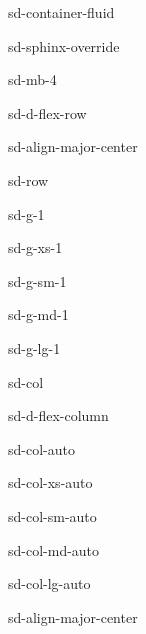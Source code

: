 \documentclass[letterpaper,10pt,english]{jupyterBook}
\begin{document}
\begin{sphinxuseclass}{sd-container-fluid}
\begin{sphinxuseclass}{sd-sphinx-override}
\begin{sphinxuseclass}{sd-mb-4}
\begin{sphinxuseclass}{sd-d-flex-row}
\begin{sphinxuseclass}{sd-align-major-center}
\begin{sphinxuseclass}{sd-row}
\begin{sphinxuseclass}{sd-g-1}
\begin{sphinxuseclass}{sd-g-xs-1}
\begin{sphinxuseclass}{sd-g-sm-1}
\begin{sphinxuseclass}{sd-g-md-1}
\begin{sphinxuseclass}{sd-g-lg-1}
\begin{sphinxuseclass}{sd-col}
\begin{sphinxuseclass}{sd-d-flex-column}
\begin{sphinxuseclass}{sd-col-auto}
\begin{sphinxuseclass}{sd-col-xs-auto}
\begin{sphinxuseclass}{sd-col-sm-auto}
\begin{sphinxuseclass}{sd-col-md-auto}
\begin{sphinxuseclass}{sd-col-lg-auto}
\begin{sphinxuseclass}{sd-align-major-center}\begin{center}\end{center}
\end{sphinxuseclass}
\end{sphinxuseclass}
\end{sphinxuseclass}
\end{sphinxuseclass}
\end{sphinxuseclass}
\end{sphinxuseclass}
\end{sphinxuseclass}

\end{sphinxuseclass}
\end{sphinxuseclass}
\end{sphinxuseclass}
\end{sphinxuseclass}
\end{sphinxuseclass}
\end{sphinxuseclass}
\end{sphinxuseclass}
\end{sphinxuseclass}
\end{sphinxuseclass}
\end{sphinxuseclass}
\end{sphinxuseclass}
\end{sphinxuseclass}
\end{document}
